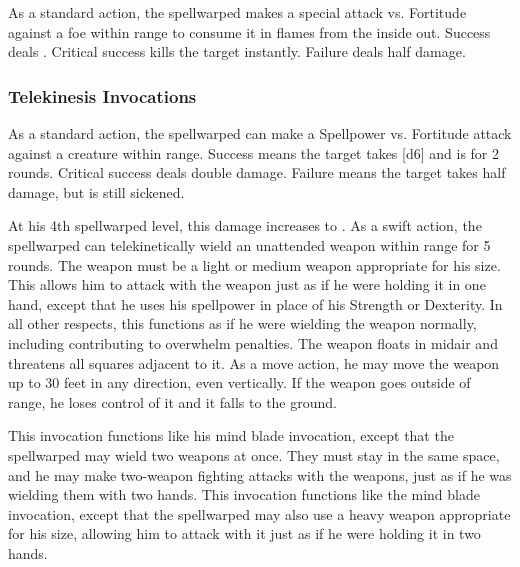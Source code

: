             As a standard action, the spellwarped makes a special attack vs. Fortitude against a foe within \rngclose range to consume it in flames from the inside out.
            Success deals .
            Critical success kills the target instantly.
            Failure deals half damage.

        \subsubsection{Telekinesis Invocations}
            As a standard action, the spellwarped can make a Spellpower vs. Fortitude attack against a creature within \rngclose range.
            Success means the target takes [d6] and is \sickened for 2 rounds.
            Critical success deals double damage.
            Failure means the target takes half damage, but is still sickened.
            \par At his 4th spellwarped level, this damage increases to .
            As a swift action, the spellwarped can telekinetically wield an unattended weapon within \rngclose range for 5 rounds.
            The weapon must be a light or medium weapon appropriate for his size.
            This allows him to attack with the weapon just as if he were holding it in one hand, except that he uses his spellpower in place of his Strength or Dexterity.
            In all other respects, this functions as if he were wielding the weapon normally, including contributing to overwhelm penalties.
            The weapon floats in midair and threatens all squares adjacent to it.
            As a move action, he may move the weapon up to 30 feet in any direction, even vertically.
            If the weapon goes outside of \rngclose range, he loses control of it and it falls to the ground.

            This invocation functions like his mind blade invocation, except that the spellwarped may wield two weapons at once.
            They must stay in the same space, and he may make two-weapon fighting attacks with the weapons, just as if he was wielding them with two hands.
            This invocation functions like the mind blade invocation, except that the spellwarped may also use a heavy weapon appropriate for his size, allowing him to attack with it just as if he were holding it in two hands.

